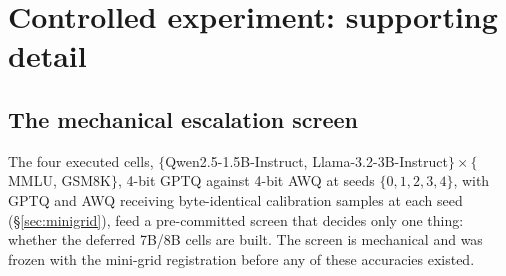 %
%

\section{Controlled experiment: supporting detail}
\label{app:minigrid-detail}

\subsection{The mechanical escalation screen}
\label{app:escalation}

The four executed cells, $\{$Qwen2.5-1.5B-Instruct, Llama-3.2-3B-Instruct$\}
\times\{$MMLU, GSM8K$\}$, 4-bit GPTQ against 4-bit AWQ at seeds
$\{0,1,2,3,4\}$, with GPTQ and AWQ receiving byte-identical calibration samples
at each seed (\S\ref{sec:minigrid}), feed a pre-committed screen that decides
only one thing: whether the deferred 7B/8B cells are built. The screen is
mechanical and was frozen with the mini-grid registration before any of these
accuracies existed.

